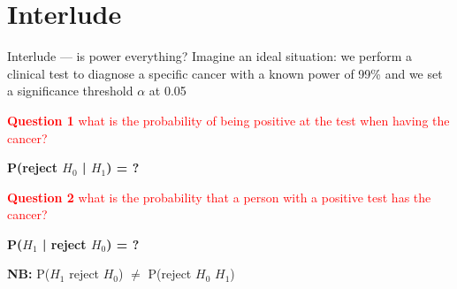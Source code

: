 \documentclass[
  ignorenonframetext,
  aspectratio=169,
  t]{beamer}
\newcommand{\bluenorm}[1]{\textcolor{bluebeamer}{#1}}
\newcommand{\bluebold}[1]{\textcolor{bluebeamer}{\textbf{#1}}}
\begin{document}
\section{Interlude}\label{interlude}

\begin{frame}{Interlude --- is power everything?}
\protect{}\label{interlude-is-power-everything}
Imagine an \bluenorm{ideal situation}: we perform a clinical test to
diagnose a specific cancer with a known \bluenorm{power of 99\%} and we
set a significance threshold \bluenorm{$\alpha$ at 0.05}

\textcolor{red}{\textbf{Question 1} what is the probability of being positive at the test when having the cancer?}

\centering \bluebold{P(reject $H_0$ | $H_1$) = ?}

\raggedright
\vspace{0.5cm}

\pause

\textcolor{red}{\textbf{Question 2} what is the probability that a person with a positive test has the cancer?}

\centering
\bluebold{P($H_1$ | reject $H_0$) = ?}

\raggedright

\vspace{0.5cm}

\textbf{NB:} P(\(H_1\) \textbar{} reject \(H_0\)) \(\neq\) P(reject
\(H_0\) \textbar{} \(H_1\))
\end{frame}
\end{document}
